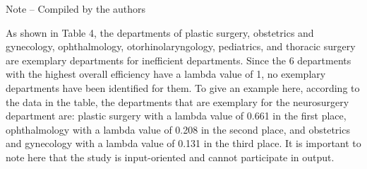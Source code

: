 
Note -- Compiled by the authors

As shown in Table 4, the departments of plastic surgery, obstetrics and
gynecology, ophthalmology, otorhinolaryngology, pediatrics, and thoracic
surgery are exemplary departments for inefficient departments. Since the
6 departments with the highest overall efficiency have a lambda value of
1, no exemplary departments have been identified for them. To give an
example here, according to the data in the table, the departments that
are exemplary for the neurosurgery department are: plastic surgery with
a lambda value of 0.661 in the first place, ophthalmology with a lambda
value of 0.208 in the second place, and obstetrics and gynecology with a
lambda value of 0.131 in the third place. It is important to note here
that the study is input-oriented and cannot participate in output.


